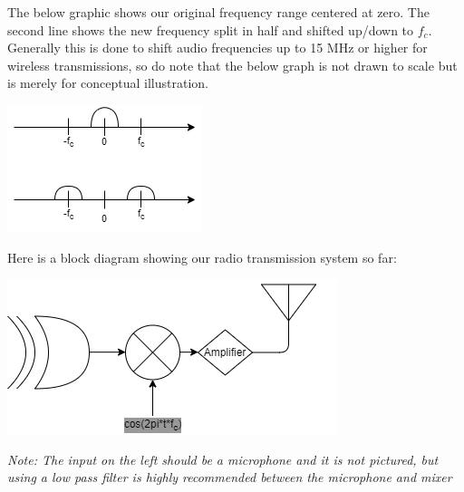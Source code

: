 \documentclass[12pt]{article}
\begin{document}
The below graphic shows our original frequency range centered at zero. The second line shows the new frequency split in half and shifted up/down to $f_c$. Generally this is done to shift audio frequencies up to 15 MHz or higher for wireless transmissions, so do note that the below graph is not drawn to scale but is merely for conceptual illustration.
\begin{center}
\includegraphics[scale=1.65]{freqshiftDrawing_topbit}
\end{center}
Here is a block diagram showing our radio transmission system so far:
\begin{center}
\includegraphics[scale=1]{radioTransmitter}
\end{center}
\textit{Note: The input on the left should be a microphone and it is not pictured, but using a low pass filter is highly recommended between the microphone and mixer}
\end{document}
